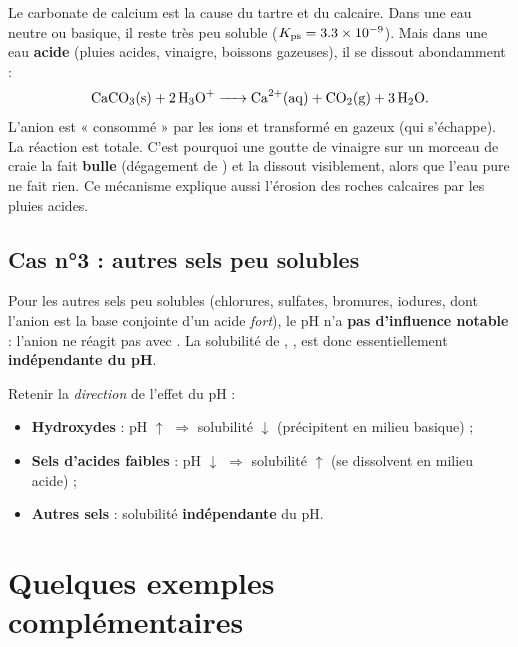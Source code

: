 \documentclass[11pt,a4paper]{article}
\newcommand{\Kps}{K_{\mathrm{ps}}}
\begin{document}
\begin{exemple}
Le carbonate de calcium  est la cause du tartre et du calcaire. Dans une eau neutre ou
basique, il reste très peu soluble ($\Kps=\num{3{,}3e-9}$). Mais dans une eau \textbf{acide} (pluies
acides, vinaigre, boissons gazeuses), il se dissout abondamment :
\[ \ce{CaCO3(s) + 2 H3O+ -> Ca^{2+}(aq) + CO2(g) + 3 H2O}. \]
L'anion  est « consommé » par les ions  et transformé en  gazeux (qui
s'échappe). La réaction est totale. C'est pourquoi une goutte de vinaigre sur un morceau de craie la
fait \textbf{bulle} (dégagement de ) et la dissout visiblement, alors que l'eau pure ne fait
rien. Ce mécanisme explique aussi l'érosion des roches calcaires par les pluies acides.
\end{exemple}

\subsection{Cas n°3 : autres sels peu solubles}

Pour les autres sels peu solubles (chlorures, sulfates, bromures, iodures, dont l'anion est la base
conjointe d'un acide \emph{fort}), le pH n'a \textbf{pas d'influence notable} : l'anion ne réagit pas
avec . La solubilité de , ,  est donc essentiellement
\textbf{indépendante du pH}.

\begin{attention}
Retenir la \emph{direction} de l'effet du pH :
\begin{itemize}[leftmargin=1.6em,topsep=2pt,itemsep=1pt]
  \item \textbf{Hydroxydes} : pH $\uparrow$ $\Rightarrow$ solubilité $\downarrow$ (précipitent en
        milieu basique) ;
  \item \textbf{Sels d'acides faibles} : pH $\downarrow$ $\Rightarrow$ solubilité $\uparrow$ (se
        dissolvent en milieu acide) ;
  \item \textbf{Autres sels} : solubilité \textbf{indépendante} du pH.
\end{itemize}
\end{attention}

\section{Quelques exemples complémentaires}
\end{document}
